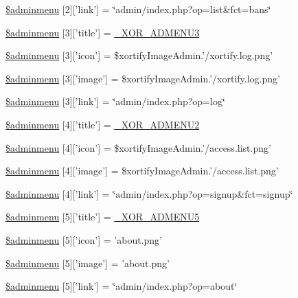 \begin{DoxyCompactItemize}
\item 
\hyperlink{menu_8php_a5f30f443311414593df5a4ae2c7501c8}{\$adminmenu} \mbox{[}2\mbox{]}\mbox{[}'link'\mbox{]} = \char`\"{}admin/index.\-php?op=list\&fct=bans\char`\"{}
\item 
\hyperlink{menu_8php_ad27660fd5d267f334743070c732b1286}{\$adminmenu} \mbox{[}3\mbox{]}\mbox{[}'title'\mbox{]} = \hyperlink{modinfo_8php_a008c720fa75affb52127965361361fd8}{\-\_\-\-X\-O\-R\-\_\-\-A\-D\-M\-E\-N\-U3}
\item 
\hyperlink{menu_8php_a967967c3b047a56a25c5e7fb4979a0de}{\$adminmenu} \mbox{[}3\mbox{]}\mbox{[}'icon'\mbox{]} = \$xortify\-Image\-Admin.'/xortify.\-log.\-png'
\item 
\hyperlink{menu_8php_a611f5939c752bb454bdce8f81812e872}{\$adminmenu} \mbox{[}3\mbox{]}\mbox{[}'image'\mbox{]} = \$xortify\-Image\-Admin.'/xortify.\-log.\-png'
\item 
\hyperlink{menu_8php_ac8c8ccf89ea2c8889dd64b08737d6dd9}{\$adminmenu} \mbox{[}3\mbox{]}\mbox{[}'link'\mbox{]} = \char`\"{}admin/index.\-php?op=log\char`\"{}
\item 
\hyperlink{menu_8php_ac3c70c66723d68528e5e9c8a4383c126}{\$adminmenu} \mbox{[}4\mbox{]}\mbox{[}'title'\mbox{]} = \hyperlink{modinfo_8php_a95a892b4875491ced8fbd2f549d930d7}{\-\_\-\-X\-O\-R\-\_\-\-A\-D\-M\-E\-N\-U2}
\item 
\hyperlink{menu_8php_ae825aefb069414ecc0bbf1fc86335167}{\$adminmenu} \mbox{[}4\mbox{]}\mbox{[}'icon'\mbox{]} = \$xortify\-Image\-Admin.'/access.\-list.\-png'
\item 
\hyperlink{menu_8php_aab8f8f168350fdbc929c79d6f8e6564c}{\$adminmenu} \mbox{[}4\mbox{]}\mbox{[}'image'\mbox{]} = \$xortify\-Image\-Admin.'/access.\-list.\-png'
\item 
\hyperlink{menu_8php_a076adc5338eb254a63b2e2d679087482}{\$adminmenu} \mbox{[}4\mbox{]}\mbox{[}'link'\mbox{]} = \char`\"{}admin/index.\-php?op=signup\&fct=signup\char`\"{}
\item 
\hyperlink{menu_8php_a014e06ed36a394774cc2f03aa232a072}{\$adminmenu} \mbox{[}5\mbox{]}\mbox{[}'title'\mbox{]} = \hyperlink{modinfo_8php_affba63ea40fb251b4aa22a524aa36121}{\-\_\-\-X\-O\-R\-\_\-\-A\-D\-M\-E\-N\-U5}
\item 
\hyperlink{menu_8php_aadc33c1b4aea642afa84d339642b4844}{\$adminmenu} \mbox{[}5\mbox{]}\mbox{[}'icon'\mbox{]} = 'about.\-png'
\item 
\hyperlink{menu_8php_a2aba67319256287d166fc8ebfa4bede6}{\$adminmenu} \mbox{[}5\mbox{]}\mbox{[}'image'\mbox{]} = 'about.\-png'
\item 
\hyperlink{menu_8php_a86c31a48d4510b1076e6fbfb731ba1d8}{\$adminmenu} \mbox{[}5\mbox{]}\mbox{[}'link'\mbox{]} = \char`\"{}admin/index.\-php?op=about\char`\"{}
\end{DoxyCompactItemize}


